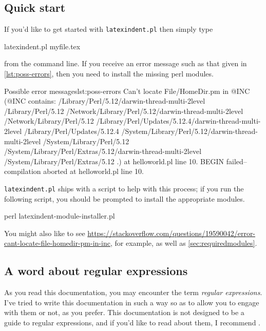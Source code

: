 \subsection{Quick start}\label{sec:quickstart}
	If you'd like to get started with \texttt{latexindent.pl} then simply type
	\begin{commandshell}
latexindent.pl myfile.tex
\end{commandshell}
	from the command line. If you receive an error message such as that given in
	\cref{lst:poss-errors}, then you need to install the missing perl modules.
	\begin{cmhlistings}[style=tcblatex,language=Perl]{Possible error messages}{lst:poss-errors}
Can't locate File/HomeDir.pm in @INC (@INC contains: /Library/Perl/5.12/darwin-thread-multi-2level /Library/Perl/5.12 /Network/Library/Perl/5.12/darwin-thread-multi-2level /Network/Library/Perl/5.12 /Library/Perl/Updates/5.12.4/darwin-thread-multi-2level /Library/Perl/Updates/5.12.4 /System/Library/Perl/5.12/darwin-thread-multi-2level /System/Library/Perl/5.12 /System/Library/Perl/Extras/5.12/darwin-thread-multi-2level /System/Library/Perl/Extras/5.12 .) at helloworld.pl line 10.
BEGIN failed--compilation aborted at helloworld.pl line 10.
\end{cmhlistings}
	\texttt{latexindent.pl} ships with a script to help with this process; if you run the
	following script, you should be prompted to install the appropriate modules.
	\begin{commandshell}
perl latexindent-module-installer.pl
\end{commandshell}
	You might also like to see
	\href{https://stackoverflow.com/questions/19590042/error-cant-locate-file-homedir-pm-in-inc}{https://stackoverflow.com/questions/19590042/error-cant-locate-file-homedir-pm-in-inc},
	for example, as well as \vref{sec:requiredmodules}.

\subsection{A word about regular expressions}
	As you read this documentation, you may encounter the term \emph{regular expressions}.
	I've tried to write this documentation in such a way so as to allow you to engage with
	them or not, as you prefer. This documentation is not designed to be a guide to regular
	expressions, and if you'd like to read about them, I recommend \cite{masteringregexp}.
